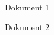 \documentclass[german]{tfbrief}
\date{\today}
\begin{document}
\begin{letter}

%
%
\lipsum

\end{letter}

%
%
\enlargethispage{1cm} %

\begin{attachment}
\item Dokument 1
\item Dokument 2
\end{attachment}
\end{document}
